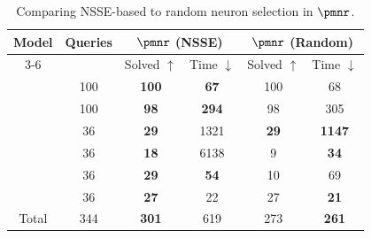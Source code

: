 \begin{table}[htb]
    \centering
	\caption{Comparing NSSE-based to random neuron selection in \(\pmnr\).}
	\begin{tabular}{|c|c|cc|cc|}
		\hline
		\multirow{2}{*}{Model}                   & \multirow{2}{*}{Queries}       &
		\multicolumn{2}{c|}{\(\pmnr\) (NSSE)} & \multicolumn{2}{c|}{\(\pmnr\) (Random)}                                                                                                                             \\ \cline{3-6}
		                                         &                                & \multicolumn{1}{c|}{Solved \(\uparrow\)} & Time \(\downarrow\) & \multicolumn{1}{c|}{Solved \(\uparrow\)} & Time \(\downarrow\) \\ \hline
		\LeakyReluFive                           & 100                            & \multicolumn{1}{c|}{\textbf{100}}        & \textbf{67}         & \multicolumn{1}{c|}{100}                 & 68                  \\ \hline
		\LeakyReluEight                          & 100                            & \multicolumn{1}{c|}{\textbf{98}}         & \textbf{294}        & \multicolumn{1}{c|}{98}                  & 305                 \\ \hline
		\LeakyReluFourteen                       & 36                             & \multicolumn{1}{c|}{\textbf{29}}         & 1321                & \multicolumn{1}{c|}{\textbf{29}}         & \textbf{1147}       \\ \hline
		\ReluSignMax                             & 36                             & \multicolumn{1}{c|}{\textbf{18}}         & 6138                & \multicolumn{1}{c|}{9}                   & \textbf{34}         \\ \hline
		\ReluBilinearSoftmax                     & 36                             & \multicolumn{1}{c|}{\textbf{29}}         & \textbf{54}         & \multicolumn{1}{c|}{10}                  & 69                  \\ \hline
		\LeakyReluSigmoid                        & 36                             & \multicolumn{1}{c|}{\textbf{27}}         & 22                  & \multicolumn{1}{c|}{27}                  & \textbf{21}         \\ \hline
		Total                                    & 344                            & \multicolumn{1}{c|}{\textbf{301}}        & 619                 & \multicolumn{1}{c|}{273}                 & \textbf{261}        \\ \hline
	\end{tabular}
	\label{tab:results-neuron-selection}
\end{table}